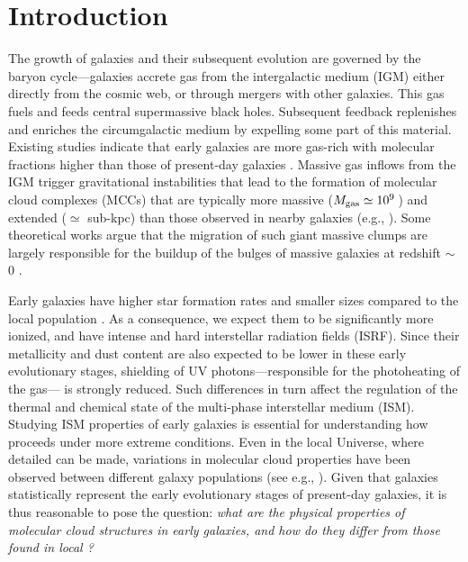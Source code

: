 \IfFileExists{emulateapjlegacy.cls}{\documentclass[iop]{emulateapjlegacy}}{\documentclass[iop]{emulateapj}}
\begin{document}

\section{Introduction}
The growth of galaxies and their subsequent evolution are governed by the baryon cycle---galaxies accrete gas from the intergalactic medium (IGM) either directly from the cosmic web, or through mergers with other galaxies. This gas fuels \SF and feeds central supermassive black holes. Subsequent feedback replenishes and enriches the circumgalactic medium by expelling some
part of this material.
%
Existing studies indicate that early galaxies are more gas-rich with molecular fractions higher than those of present-day galaxies \citep[e.g.,][]{vandevoort11b, Decarli16a, Decarli17a}. Massive gas inflows from the IGM trigger gravitational instabilities that lead to the formation of molecular cloud complexes (MCCs) that are typically more massive ($M_{\rm gas}\simeq 10^9$\,\Msun) and extended ($\simeq$ sub-kpc) than those observed in nearby galaxies (e.g., \citealt{Gabor13a, Hopkins14a, Inoue16a}). Some theoretical works argue that the migration of such giant massive clumps are largely responsible for the buildup of the bulges of massive galaxies at redshift \z$\sim$\,0 \citep[e.g.,][]{Ceverino10a}.

Early galaxies have higher star formation rates \citep[SFR; ][]{Behroozi13b, Sparre15a, Maiolino15a, Dunlop17a} and smaller sizes \citep[e.g.,][]{Bouwens11a, Ono13a} compared to the local population \citep[see also a review by][]{Stark16a}.
%
As a consequence, we expect them to be significantly more ionized, and have intense and hard interstellar radiation fields (ISRF). Since their metallicity and dust content are also expected to be lower in these early evolutionary stages, shielding of UV photons---responsible for the photoheating of the gas---  is strongly reduced. Such differences in turn affect the regulation of the thermal and chemical state of the multi-phase interstellar medium (ISM). Studying ISM properties of early galaxies is essential for understanding how \SF proceeds under more extreme conditions.
%
Even in the local Universe, where detailed \obs can be made, variations in molecular cloud properties have been observed between different galaxy populations (see e.g., \citealt{Hughes10a, Hughes13b}).  Given that \highz galaxies statistically represent the early evolutionary stages of present-day galaxies, it is thus reasonable to pose the question: {\it what are the physical properties of molecular cloud structures in early galaxies, and how do they differ from those found in local \galpop?}
%
\end{document}
